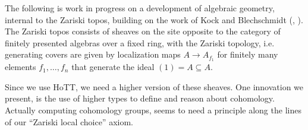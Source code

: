 
The following is work in progress on a development of algebraic geometry, internal to the Zariski topos, building on the work of Kock and Blechschmidt (\cite{MISSING}, \cite{ingo-thesis}).
The Zariski topos consists of sheaves on the site opposite to the category of finitely presented algebras over a fixed ring, with the Zariski topology, i.e. generating covers are given by localization maps $A\to A_{f_1}$ for finitely many elements $f_1,\dots,f_n$ that generate the ideal $(1)=A\subseteq A$.

Since we use HoTT, we need a higher version of these sheaves.
One innovation we present, is the use of higher types to define and reason about cohomology.
Actually computing cohomology groups, seems to need a principle along the lines of our ``Zariski local choice'' axiom.